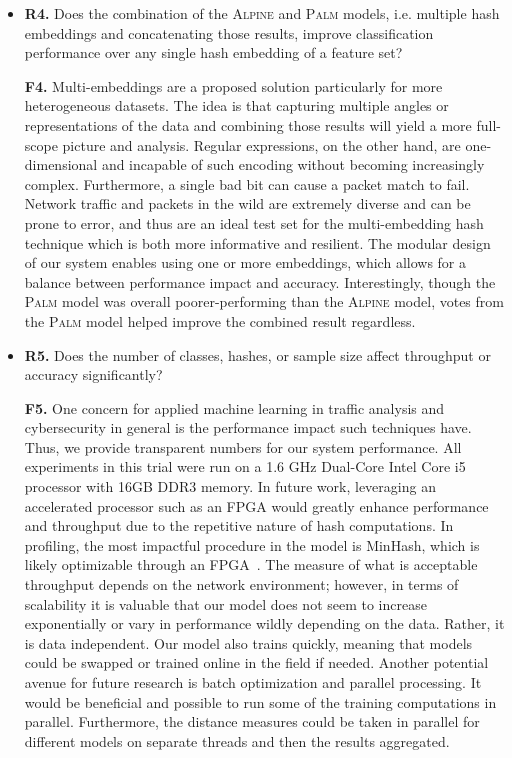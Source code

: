 \begin{itemize}
\item\textbf{R4.} Does the combination of the \textsc{Alpine} and \textsc{Palm} models, i.e. multiple hash embeddings and concatenating those results, improve classification performance over any single hash embedding of a feature set?

\textbf{F4.} Multi-embeddings are a proposed solution particularly for more heterogeneous datasets. The idea is that capturing multiple angles or representations of the data and combining those results will yield a more full-scope picture and analysis. Regular expressions, on the other hand, are one-dimensional and incapable of such encoding without becoming increasingly complex. Furthermore, a single bad bit can cause a packet match to fail. Network traffic and packets in the wild are extremely diverse and can be prone to error, and thus are an ideal test set for the multi-embedding hash technique which is both more informative and resilient. The modular design of our system enables using one or more embeddings, which allows for a balance between performance impact and accuracy. Interestingly, though the \textsc{Palm} model was overall poorer-performing than the \textsc{Alpine} model, votes from the \textsc{Palm} model helped improve the combined result regardless.

\item\textbf{R5.} Does the number of classes, hashes, or sample size affect throughput or accuracy significantly?

\textbf{F5.} One concern for applied machine learning in traffic analysis and cybersecurity in general is the performance impact such techniques have. Thus, we provide transparent numbers for our system performance. All experiments in this trial were run on a 1.6 GHz Dual-Core Intel Core i5 processor with 16GB DDR3 memory. In future work, leveraging an accelerated processor such as an FPGA would greatly enhance performance and throughput due to the repetitive nature of hash computations. In profiling, the most impactful procedure in the model is MinHash, which is likely optimizable through an FPGA~\cite{fpga}. The measure of what is acceptable throughput depends on the network environment; however, in terms of scalability it is valuable that our model does not seem to increase exponentially or vary in performance wildly depending on the data. Rather, it is data independent. Our model also trains quickly, meaning that models could be swapped or trained online in the field if needed. Another potential avenue for future research is batch optimization and parallel processing. It would be beneficial and possible to run some of the training computations in parallel. Furthermore, the distance measures could be taken in parallel for different models on separate threads and then the results aggregated.


\end{itemize}
